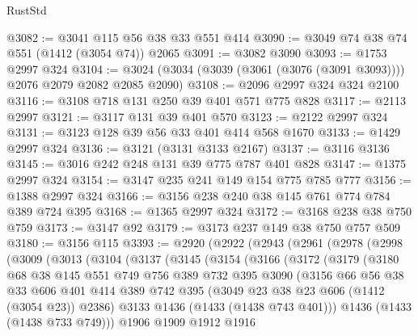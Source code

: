 \begin{lexlean}{RustStd}
\begin{coremodule}
@3082 := @3041 @115 @56 @38 @33 @551 @414
@3090 := @3049 @74 @38 @74 @551 (@1412 (@3054 @74)) @2065
@3091 := @3082 @3090
@3093 := @1753 @2997 @324
@3104 := @3024 (@3034 (@3039 (@3061 (@3076 (@3091 @3093)))) @2076 @2079 @2082 @2085 @2090)
@3108 := @2096 @2997 @324 @324 @2100
@3116 := @3108 @718 @131 @250 @39 @401 @571 @775 @828
@3117 := @2113 @2997
@3121 := @3117 @131 @39 @401 @570
@3123 := @2122 @2997 @324
@3131 := @3123 @128 @39 @56 @33 @401 @414 @568 @1670
@3133 := @1429 @2997 @324
@3136 := @3121 (@3131 @3133 @2167)
@3137 := @3116 @3136
@3145 := @3016 @242 @248 @131 @39 @775 @787 @401 @828
@3147 := @1375 @2997 @324
@3154 := @3147 @235 @241 @149 @154 @775 @785 @777
@3156 := @1388 @2997 @324
@3166 := @3156 @238 @240 @38 @145 @761 @774 @784 @389 @724 @395
@3168 := @1365 @2997 @324
@3172 := @3168 @238 @38 @750 @759
@3173 := @3147 @92
@3179 := @3173 @237 @149 @38 @750 @757 @509
@3180 := @3156 @115
@3393 := @2920
    (@2922
      (@2943
        (@2961
          (@2978
            (@2998
              (@3009
                (@3013
                  (@3104
                    (@3137
                      (@3145
                        (@3154
                          (@3166
                            (@3172
                              (@3179
                                (@3180
                                  @68
                                  @38
                                  @145
                                  @551
                                  @749
                                  @756
                                  @389
                                  @732
                                  @395
                                  @3090
                                  (@3156
                                    @66
                                    @56
                                    @38
                                    @33
                                    @606
                                    @401
                                    @414
                                    @389
                                    @742
                                    @395
                                    (@3049 @23 @38 @23 @606 (@1412 (@3054 @23)) @2386)
                                    @3133
                                    @1436
                                    (@1433 (@1438 @743 @401)))
                                  @1436
                                  (@1433 (@1438 @733 @749)))
                                @1906
                                @1909
                                @1912
                                @1916

\end{coremodule}
\end{lexlean}
